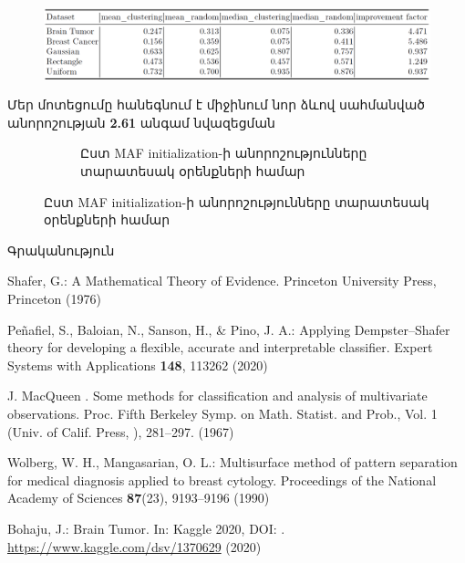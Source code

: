 \documentclass[aspectratio=169]{beamer}
\begin{document}
\begin{frame}
\begin{figure}
    \centering
    \includegraphics[width=1\linewidth]{../../fig/score_df.png}
\end{figure}
Մեր մոտեցումը հանեգնում է միջինում նոր ձևով սահմանված անորոշության \textbf{2.61} անգամ նվազեցման
\end{frame}

\begin{figure}
\begin{figure}
    \caption{Ըստ { \rm MAF initialization}-ի անորոշությունները տարատեսակ օրենքների համար}
    \label{fig:bars}
\end{figure}
\end{figure}

\begin{frame}{Գրականություն}
    
\begin{thebibliography}{8}
{\rm
{}
Shafer, G.: A Mathematical Theory of Evidence. Princeton University Press, Princeton (1976)

Peñafiel, S., Baloian, N., Sanson, H., \& Pino, J. A.: Applying Dempster–Shafer theory for developing a flexible, accurate and interpretable classifier. Expert Systems with Applications \textbf{148}, 113262 (2020)

J. MacQueen . Some methods for classification and analysis of multivariate observations. Proc. Fifth Berkeley Symp. on Math. Statist. and Prob., Vol. 1 (Univ. of Calif. Press, ), 281--297. (1967)

Wolberg, W. H., Mangasarian, O. L.: Multisurface method of pattern separation for medical diagnosis applied to breast cytology. Proceedings of the National Academy of Sciences \textbf{87}(23), 9193--9196 (1990)

Bohaju, J.: Brain Tumor. In: Kaggle 2020, DOI: . \url{https://www.kaggle.com/dsv/1370629} (2020)
}
\end{thebibliography}
\end{frame}
\end{document}
